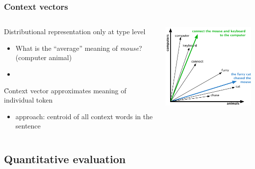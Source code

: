 \documentclass[t]{beamer} %
\begin{document}
\begin{frame}
  \frametitle{Context vectors \citep{Schuetze:98}}

  \gap
  \begin{columns}[c]
    \begin{column}{50mm}
      Distributional representation only at type level
      \begin{itemize}
      \item[\hand] What is the ``average'' meaning of \emph{mouse}? (computer \vs animal)
      \item[]
      \end{itemize}
      \pause
      \h{Context vector} approximates meaning of individual token
      \begin{itemize}
      \item {} approach:
        centroid of all context words in the sentence
      \end{itemize}
    \end{column}
    \begin{column}{60mm}
      \includegraphics[width=60mm]{img/illustration_context_vectors_mouse}
    \end{column}
  \end{columns}
\end{frame}


\subsection{Quantitative evaluation}

\end{document}
